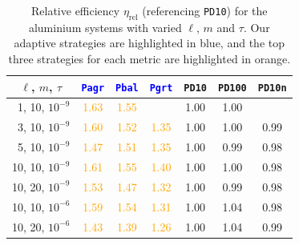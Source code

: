 \documentclass[hidelinks,onefignum,onetabnum]{siamart250211}
\newcommand{\releta}{\eta_{\mathrm{rel}}}
\newcommand{\sPbal}{\texttt{Pbal}\xspace}
\newcommand{\sPagr}{\texttt{Pagr}\xspace}
\newcommand{\sPgrt}{\texttt{Pgrt}\xspace}
\newcommand{\sPdten}{\texttt{PD10}\xspace}
\newcommand{\sPdhun}{\texttt{PD100}\xspace}
\newcommand{\sPdnorm}{\texttt{PD10n}\xspace}
\begin{document}
\begin{table}[H]
  \centering
  \begin{tabular}{c|ccc|ccc}
      \toprule
      $\ell$, $m$, $\tau$                  & \textcolor{blue}{\sPagr} & \textcolor{blue}{\sPbal} & \textcolor{blue}{\sPgrt} & \sPdten & \sPdhun & \sPdnorm \\
      \midrule
      \textcolor{white}{0}1, 10, $10^{-9}$ & \textcolor{orange}{1.63}        & \textcolor{orange}{1.55}         &  & 1.00          & 1.00           &              \\
      \textcolor{white}{0}3, 10, $10^{-9}$ & \textcolor{orange}{1.60}        & \textcolor{orange}{1.52}         & \textcolor{orange}{1.35}        & 1.00          & 1.00           & 0.99             \\
      \textcolor{white}{0}5, 10, $10^{-9}$ & \textcolor{orange}{1.47}        & \textcolor{orange}{1.51}         & \textcolor{orange}{1.35}        & 1.00          & 0.99           & 0.98             \\
      \midrule
      10, 10, $10^{-9}$                    & \textcolor{orange}{1.61}        & \textcolor{orange}{1.55}         & \textcolor{orange}{1.40}        & 1.00          & 1.00           & 0.98             \\
      10, 20, $10^{-9}$                    & \textcolor{orange}{1.53}        & \textcolor{orange}{1.47}         & \textcolor{orange}{1.32}        & 1.00          & 0.99           & 0.98             \\
      \midrule
      10, 10, $10^{-6}$                    & \textcolor{orange}{1.59}        & \textcolor{orange}{1.54}         & \textcolor{orange}{1.31}        & 1.00          & 1.04           & 0.98             \\
      10, 20, $10^{-6}$                    & \textcolor{orange}{1.43}        & \textcolor{orange}{1.39}         & \textcolor{orange}{1.26}        & 1.00          & 1.04           & 0.99             \\
      \bottomrule
  \end{tabular}
  \caption{Relative efficiency $\releta$ (referencing \sPdten) 
  for the aluminium systems with varied $\ell$, $m$ and $\tau$.
  Our adaptive strategies are highlighted in blue, 
  and the top three strategies for each metric are
  highlighted in orange.}
  \label{tab:summary_Al_re}
\end{table}
\end{document}
